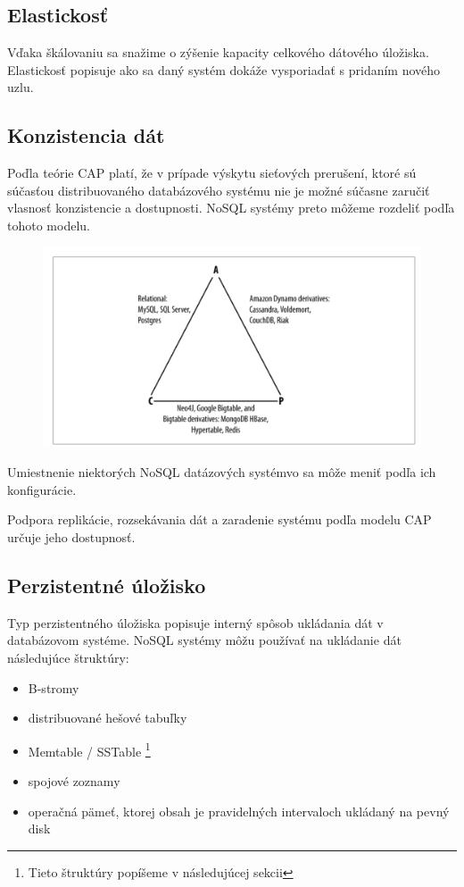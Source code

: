 \documentclass[11pt,twoside,a4paper]{book}
\begin{document}
\subsection{Elastickosť}
Vďaka škálovaniu sa snažime o zýšenie kapacity celkového dátového úložiska. Elastickosť popisuje ako sa daný systém dokáže vysporiadať s pridaním nového uzlu.


\subsection{Konzistencia dát}
Poďla teórie CAP platí, že v prípade výskytu sieťových prerušení, ktoré sú súčasťou distribuovaného databázového systému nie je možné súčasne zaručiť vlasnosť konzistencie a dostupnosti. NoSQL systémy preto môžeme rozdeliť podľa tohoto modelu.

\begin{figure}[h]
 \centering
 \includegraphics[width=16cm]{./figures/capDatabases.png}
 \caption{}
 \label{fig:scalling}
\end{figure}

Umiestnenie niektorých NoSQL datázových systémvo sa môže meniť podľa ich konfigurácie. 

Podpora replikácie, rozsekávania dát a zaradenie systému podľa modelu CAP určuje jeho dostupnosť.

\subsection{Perzistentné úložisko}
Typ perzistentného úložiska popisuje interný spôsob ukládania dát v databázovom systéme. NoSQL systémy môžu používať na ukládanie dát následujúce štruktúry: 
\begin{itemize}
 \item B-stromy
 \item distribuované hešové tabuľky
 \item Memtable / SSTable \footnote{Tieto štruktúry popíšeme v následujúcej sekcii}
 \item spojové zoznamy
 \item operačná pämeť, ktorej obsah je pravidelných intervaloch ukládaný na pevný disk
\end{itemize}
 
\end{document}
